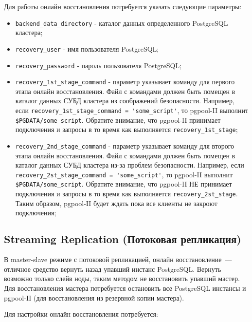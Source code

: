 Для работы онлайн восстановления потребуется указать следующие параметры:

\begin{itemize}

  \item \lstinline!backend_data_directory! - каталог данных определенного PostgreSQL кластера;
  \item \lstinline!recovery_user! - имя пользователя PostgreSQL;
  \item \lstinline!recovery_password! - пароль пользователя PostgreSQL;
  \item \lstinline!recovery_1st_stage_command! - параметр указывает команду для первого этапа онлайн восстановления. Файл с командами должен быть помещен в каталог данных СУБД кластера из соображений безопасности. Например, если \lstinline!recovery_1st_stage_command = 'some_script'!, то pgpool-II выполнит \lstinline!$PGDATA/some_script!. Обратите внимание, что pgpool-II принимает подключения и запросы в то время как выполняется \lstinline!recovery_1st_stage!;
  \item \lstinline!recovery_2nd_stage_command! - параметр указывает команду для второго этапа онлайн восстановления. Файл с командами должен быть помещен в каталог данных СУБД кластера из-за проблем безопасности. Например, если \lstinline!recovery_2st_stage_command = 'some_script'!, то pgpool-II выполнит \lstinline!$PGDATA/some_script!. Обратите внимание, что pgpool-II НЕ принимает подключения и запросы в то время как выполняется \lstinline!recovery_2st_stage!. Таким образом, pgpool-II будет ждать пока все клиенты не закроют подключения;

\end{itemize}



\subsection{Streaming Replication (Потоковая репликация)}

В master-slave режиме с потоковой репликацией, онлайн восстановление~--- отличное средство вернуть назад упавший инстанс PostgreSQL. Вернуть возможно только слейв ноды, таким методом не восстановить упавший мастер. Для восстановления мастера потребуется остановить все PostgreSQL инстансы и pgpool-II (для восстановления из резервной копии мастера).

Для настройки онлайн восстановления потребуется:

